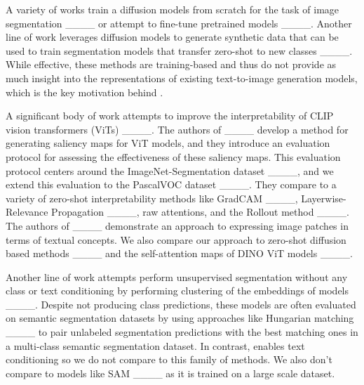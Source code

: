 A variety of works train a diffusion models from scratch for the task of image segmentation ____ or attempt to fine-tune pretrained models ____. Another line of work leverages diffusion models to generate synthetic data that can be used to train segmentation models that transfer zero-shot to new classes ____. While effective, these methods are training-based and thus do not provide as much insight into the representations of existing text-to-image generation models, which is the key motivation behind \tool{}. 

A significant body of work attempts to improve the interpretability of CLIP vision transformers (ViTs) ____. The authors of ____ develop a method for generating saliency maps for ViT models, and they introduce an evaluation protocol for assessing the effectiveness of these saliency maps. This evaluation protocol centers around the ImageNet-Segmentation dataset ____, and we extend this evaluation to the PascalVOC dataset ____. They compare to a variety of zero-shot interpretability methods like GradCAM ____, Layerwise-Relevance Propagation ____, raw attentions, and the Rollout method ____. The authors of ____ demonstrate an approach to expressing image patches in terms of textual concepts. We also compare our approach to zero-shot diffusion based methods ____ and the self-attention maps of DINO ViT models ____. 

Another line of work attempts perform unsupervised segmentation without any class or text conditioning by performing clustering of the embeddings of models ____. Despite not producing class predictions, these models are often evaluated on semantic segmentation datasets by using approaches like Hungarian matching ____ to pair unlabeled segmentation predictions with the best matching ones in a multi-class semantic segmentation dataset. In contrast, \tool{} enables text conditioning so we do not compare to this family of methods. We also don't compare to models like SAM ____ as it is trained on a large scale dataset.  %